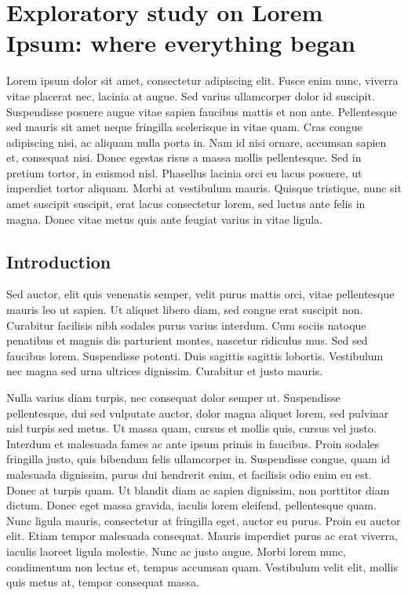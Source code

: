 \chapter[Exploratory study on Lorem Ipsum]{Exploratory study on Lorem Ipsum:
where everything began}
\label{chp:studyone}

Lorem ipsum dolor sit amet, consectetur adipiscing elit. Fusce enim nunc,
viverra vitae placerat nec, lacinia at augue.  Sed varius ullamcorper dolor
id suscipit.  Suspendisse posuere augue vitae sapien faucibus mattis et non
ante.  Pellentesque sed mauris sit amet neque fringilla scelerisque in vitae
quam.  Cras congue adipiscing nisi, ac aliquam nulla porta in.  Nam id nisi
ornare, accumsan sapien et, consequat nisi.  Donec egestas risus a massa
mollis pellentesque.  Sed in pretium tortor, in euismod nisl.  Phasellus
lacinia orci eu lacus posuere, ut imperdiet tortor aliquam.  Morbi at
vestibulum mauris.  Quisque tristique, nunc sit amet suscipit suscipit, erat
lacus consectetur lorem, sed luctus ante felis in magna.  Donec vitae metus
quis ante feugiat varius in vitae ligula.

\section{Introduction} \label{sec:studyone:intro}

Sed auctor, elit quis venenatis semper, velit purus mattis orci, vitae
pellentesque mauris leo ut sapien.  Ut aliquet libero diam, sed congue erat
suscipit non.  Curabitur facilisis nibh sodales purus varius interdum.  Cum
sociis natoque penatibus et magnis dis parturient montes, nascetur ridiculus
mus.  Sed sed faucibus lorem.  Suspendisse potenti.  Duis sagittis sagittis
lobortis.  Vestibulum nec magna sed urna ultrices dignissim.  Curabitur et
justo mauris.

Nulla varius diam turpis, nec consequat dolor semper ut. Suspendisse
pellentesque, dui sed vulputate auctor, dolor magna aliquet lorem, sed
pulvinar nisl turpis sed metus.  Ut massa quam, cursus et mollis quis,
cursus vel justo.  Interdum et malesuada fames ac ante ipsum primis in
faucibus.  Proin sodales fringilla justo, quis bibendum felis ullamcorper
in.  Suspendisse congue, quam id malesuada dignissim, purus dui hendrerit
enim, et facilisis odio enim eu est.  Donec at turpis quam.  Ut blandit diam
ac sapien dignissim, non porttitor diam dictum.  Donec eget massa gravida,
iaculis lorem eleifend, pellentesque quam.  Nunc ligula mauris, consectetur
at fringilla eget, auctor eu purus.  Proin eu auctor elit.  Etiam tempor
malesuada consequat.  Mauris imperdiet purus ac erat viverra, iaculis
laoreet ligula molestie.  Nunc ac justo augue.  Morbi lorem nunc,
condimentum non lectus et, tempus accumsan quam.  Vestibulum velit elit,
mollis quis metus at, tempor consequat massa.


